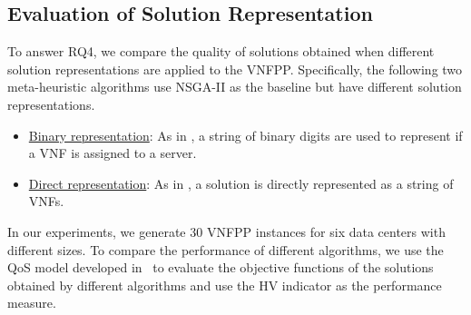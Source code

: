 \vspace{0.5em}
\noindent
{}

\subsection{Evaluation of Solution Representation}
\label{sec:alternative_representations}

To answer RQ4, we compare the quality of solutions obtained when different solution representations are applied to the VNFPP. Specifically, the following two meta-heuristic algorithms use NSGA-II as the baseline but have different solution representations.
\begin{itemize}
    \item\underline{Binary representation}: As in \cite{ChantreF20,KaurGK020,CharismiadisTPM20}, a string of binary digits are used to represent if a VNF is assigned to a server.
    \item\underline{Direct representation}: As in \cite{RankothgeLRL17}, a solution is directly represented as a string of VNFs.
\end{itemize}
In our experiments, we generate $30$ VNFPP instances for six data centers with different sizes. To compare the performance of different algorithms, we use the QoS model developed in~ to evaluate the objective functions of the solutions obtained by different algorithms and use the HV indicator as the performance measure.

